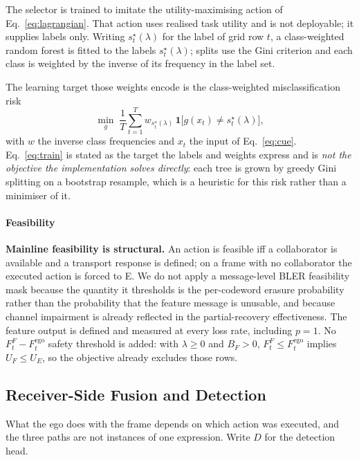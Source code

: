 \documentclass[journal]{IEEEtran}
\begin{document}
The selector is trained to imitate the utility-maximising action of Eq.~\eqref{eq:lagrangian}. That
action uses realised task utility and is not deployable; it supplies labels only. Writing
$s_t^{\star}(\lambda)$ for the label of grid row $t$, a class-weighted random forest is fitted to
the labels $s_t^{\star}(\lambda)$; splits use the Gini criterion and each class is weighted by the
inverse of its frequency in the label set.

The learning target those weights encode is the class-weighted misclassification risk
\begin{equation}
\min_{g}\; \frac{1}{T}\sum_{t=1}^{T} w_{s_t^{\star}(\lambda)}\,
\mathbf{1}\bigl[g(x_t) \neq s_t^{\star}(\lambda)\bigr],
\label{eq:train}
\end{equation}
with $w$ the inverse class frequencies and $x_t$ the input of Eq.~\eqref{eq:cue}.
Eq.~\eqref{eq:train} is stated as the target the labels and weights express and is
\emph{not the objective the implementation solves directly}: each tree is grown by greedy Gini
splitting on a bootstrap resample, which is a heuristic for this risk rather than a minimiser of
it.

\paragraph*{Feasibility} \textbf{Mainline feasibility is structural.} An action is feasible iff a
collaborator is available and a transport response is defined; on a frame with no collaborator the
executed action is forced to E. We do not apply a message-level BLER feasibility mask because the
quantity it thresholds is the per-codeword erasure probability rather than the probability that the
feature message is unusable, and because channel impairment is already reflected in the
partial-recovery effectiveness. The feature output is defined and measured at every loss rate,
including $p = 1$. No $F_t^{F} - F_t^{\mathrm{ego}}$ safety threshold is added:
with $\lambda \ge 0$ and $B_F > 0$, $F_t^{F} \le F_t^{\mathrm{ego}}$ implies $U_F \le U_E$, so the
objective already excludes those rows.

\subsection{Receiver-Side Fusion and Detection}
What the ego does with the frame depends on which action was executed, and the three paths are
not instances of one expression. Write $D$ for the detection head.
\end{document}
